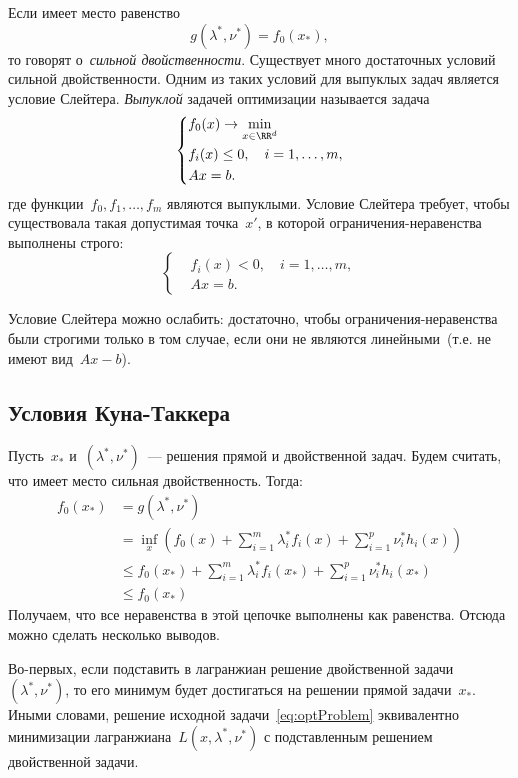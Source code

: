 \documentclass[12pt,fleqn]{article}
\begin{document}
Если имеет место равенство
\[
    g(\lambda^*, \nu^*)
    =
    f_0(x_*),
\]
то говорят о~\emph{сильной двойственности}.
Существует много достаточных условий сильной двойственности.
Одним из таких условий для выпуклых задач является условие Слейтера.
\emph{Выпуклой} задачей оптимизации называется задача
\[
    \left\{
        \begin{aligned}
            & f_0(x) \to \min_{x \in \RR^d} \\
            & f_i(x) \leq 0, \quad i = 1, \dots, m, \\
            & Ax = b.
        \end{aligned}
    \right.
\]
где функции~$f_0, f_1, \dots, f_m$ являются выпуклыми.
Условие Слейтера требует, чтобы существовала такая допустимая точка~$x'$,
в которой ограничения-неравенства выполнены строго:
\[
    \left\{
        \begin{aligned}
            & f_i(x) < 0, \quad i = 1, \dots, m, \\
            & Ax = b.
        \end{aligned}
    \right.
\]

Условие Слейтера можно ослабить: достаточно, чтобы
ограничения-неравенства были строгими только в том случае, если
они не являются линейными~(т.е. не имеют вид~$Ax - b$).

\subsection{Условия Куна-Таккера}
Пусть~$x_*$ и~$(\lambda^*, \nu^*)$~--- решения прямой и двойственной задач.
Будем считать, что имеет место сильная двойственность.
Тогда:
\begin{align*}
	f_0(x_*)
	&= g(\lambda^*, \nu^*) \\
	&=
	\inf_x \left(
	f_0(x)
	+
	\sum_{i = 1}^{m} \lambda_i^* f_i(x)
	+
	\sum_{i = 1}^{p} \nu_i^* h_i(x)
	\right) \\
	&\leq
	f_0(x_*)
	+
	\sum_{i = 1}^{m} \lambda_i^* f_i(x_*)
	+
	\sum_{i = 1}^{p} \nu_i^* h_i(x_*) \\
	&\leq
	f_0(x_*)
\end{align*}
Получаем, что все неравенства в этой цепочке выполнены как равенства.
Отсюда можно сделать несколько выводов.

Во-первых, если подставить в лагранжиан решение двойственной задачи~$(\lambda^*, \nu^*)$,
то его минимум будет достигаться на решении прямой задачи~$x_*$.
Иными словами, решение исходной задачи~\eqref{eq:optProblem} эквивалентно
минимизации лагранжиана~$L(x, \lambda^*, \nu^*)$
с подставленным решением двойственной задачи.
\end{document}
